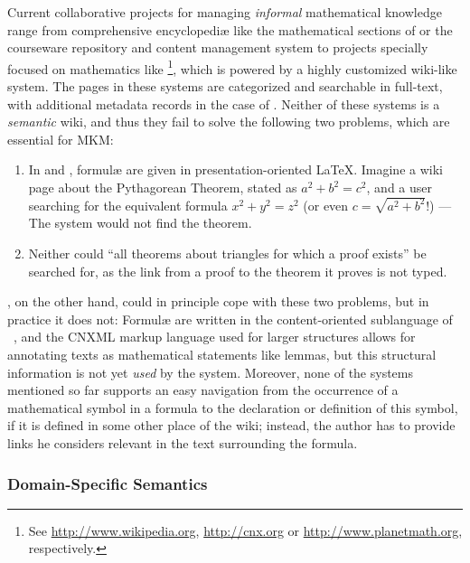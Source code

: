 \documentclass{llncs}
\begin{document}
Current collaborative projects for managing \emph{informal} mathematical knowledge range
from comprehensive encyclopediæ like the mathematical sections of  or
the courseware repository and content management system  to projects
specially focused on mathematics like \footnote{See
  \url{http://www.wikipedia.org}, \url{http://cnx.org} or \url{http://www.planetmath.org},
  respectively.}, which is powered by a highly customized wiki-like system.  The pages in
these systems are categorized and searchable in full-text, with additional metadata
records in the case of .  Neither of these systems is a
\emph{semantic} wiki, and thus they fail to solve the following two problems, which are
essential for MKM:

\begin{enumerate}
\item\label{item:formula-search-usecase} In  and ,
  formulæ are given in presentation-oriented {\LaTeX}.  Imagine a wiki page about the
  Pythagorean Theorem, stated as $a^2 + b^2 = c^2$, and a user searching for the
  equivalent formula $x^2 + y^2 = z^2$ (or even $c=\sqrt{a^2+b^2}$!) --- The system would
  not find the theorem.
\item Neither could ``all theorems about triangles for which a
  proof exists'' be searched for, as the link from a proof to the theorem it proves is not
  typed.
\end{enumerate}

, on the other hand, could in principle cope with these two problems,
but in practice it does not: Formulæ are written in the content-oriented sublanguage of
{\mathml}~\cite{CarlisleEd:MathML07}, and the CNXML markup language used for larger
structures allows for annotating texts as mathematical statements like lemmas, but this
structural information is not yet \emph{used} by the system.  Moreover, none of the
systems mentioned so far supports an easy navigation from the occurrence of a mathematical
symbol in a formula to the declaration or definition of this symbol, if it is defined in
some other place of the wiki; instead, the author has to provide links he considers
relevant in the text surrounding the formula.

\subsubsection{Domain-Specific Semantics}
\label{sec:domain-semantics}
\end{document}
